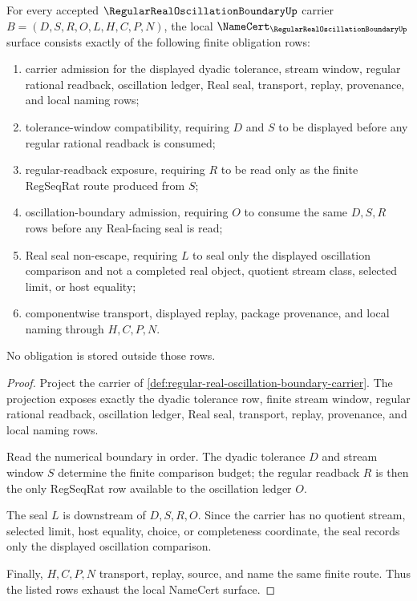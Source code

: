 \begin{theorem}
\label{thm:regular-real-oscillation-boundary-namecert-obligations}
For every accepted $\RegularRealOscillationBoundaryUp$ carrier $B=(D,S,R,O,L,H,C,P,N)$, the local $\NameCert_{\RegularRealOscillationBoundaryUp}$ surface consists exactly of the following finite obligation rows:
\begin{enumerate}
\item carrier admission for the displayed dyadic tolerance, stream window, regular rational readback, oscillation ledger, Real seal, transport, replay, provenance, and local naming rows;
\item tolerance-window compatibility, requiring $D$ and $S$ to be displayed before any regular rational readback is consumed;
\item regular-readback exposure, requiring $R$ to be read only as the finite RegSeqRat route produced from $S$;
\item oscillation-boundary admission, requiring $O$ to consume the same $D,S,R$ rows before any Real-facing seal is read;
\item Real seal non-escape, requiring $L$ to seal only the displayed oscillation comparison and not a completed real object, quotient stream class, selected limit, or host equality;
\item componentwise transport, displayed replay, package provenance, and local naming through $H,C,P,N$.
\end{enumerate}
No obligation is stored outside those rows.
\end{theorem}
\begin{proof}
Project the carrier of \autoref{def:regular-real-oscillation-boundary-carrier}. The projection exposes exactly the dyadic tolerance row, finite stream window, regular rational readback, oscillation ledger, Real seal, transport, replay, provenance, and local naming rows.

Read the numerical boundary in order. The dyadic tolerance $D$ and stream window $S$ determine the finite comparison budget; the regular readback $R$ is then the only RegSeqRat row available to the oscillation ledger $O$.

The seal $L$ is downstream of $D,S,R,O$. Since the carrier has no quotient stream, selected limit, host equality, choice, or completeness coordinate, the seal records only the displayed oscillation comparison.

Finally, $H,C,P,N$ transport, replay, source, and name the same finite route. Thus the listed rows exhaust the local NameCert surface.
\end{proof}

